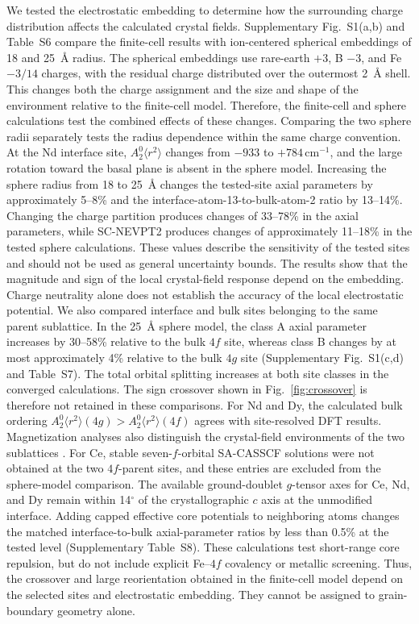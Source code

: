 \documentclass[final,1p,times]{elsarticle}
\newcommand{\Atwo}{\ensuremath{A_2^0\langle r^2\rangle}}
\DeclareRobustCommand{\rev}[1]{{\color{revcolor}#1}}
\newcommand{\invcm}{\ensuremath{\,\mathrm{cm}^{-1}}}
\begin{document}
\rev{We tested the electrostatic embedding to determine how the surrounding charge distribution affects the calculated crystal fields. Supplementary Fig.~S1(a,b) and Table~S6 compare the finite-cell results with ion-centered spherical embeddings of 18 and 25~\AA{} radius. The spherical embeddings use rare-earth $+3$, B $-3$, and Fe $-3/14$ charges, with the residual charge distributed over the outermost 2~\AA{} shell. This changes both the charge assignment and the size and shape of the environment relative to the finite-cell model. Therefore, the finite-cell and sphere calculations test the combined effects of these changes. Comparing the two sphere radii separately tests the radius dependence within the same charge convention. At the Nd interface site, $\Atwo$ changes from $-933$ to $+784$\invcm{}, and the large rotation toward the basal plane is absent in the sphere model. Increasing the sphere radius from 18 to 25~\AA{} changes the tested-site axial parameters by approximately 5--8\% and the interface-atom-13-to-bulk-atom-2 ratio by 13--14\%. Changing the charge partition produces changes of 33--78\% in the axial parameters, while SC-NEVPT2 produces changes of approximately 11--18\% in the tested sphere calculations. These values describe the sensitivity of the tested sites and should not be used as general uncertainty bounds. The results show that the magnitude and sign of the local crystal-field response depend on the embedding. Charge neutrality alone does not establish the accuracy of the local electrostatic potential.} \rev{We also compared interface and bulk sites belonging to the same parent sublattice. In the 25~\AA{} sphere model, the class A axial parameter increases by 30--58\% relative to the bulk $4f$ site, whereas class B changes by at most approximately 4\% relative to the bulk $4g$ site (Supplementary Fig.~S1(c,d) and Table~S7). The total orbital splitting increases at both site classes in the converged calculations. The sign crossover shown in Fig.~\ref{fig:crossover} is therefore not retained in these comparisons. For Nd and Dy, the calculated bulk ordering $\Atwo(4g)>\Atwo(4f)$ agrees with site-resolved DFT results. Magnetization analyses also distinguish the crystal-field environments of the two sublattices \cite{tatetsu2018,boust2022,cadogan1988}. For Ce, stable seven-$f$-orbital SA-CASSCF solutions were not obtained at the two $4f$-parent sites, and these entries are excluded from the sphere-model comparison. The available ground-doublet $g$-tensor axes for Ce, Nd, and Dy remain within 14$^\circ$ of the crystallographic $c$ axis at the unmodified interface. Adding capped effective core potentials to neighboring atoms changes the matched interface-to-bulk axial-parameter ratios by less than 0.5\% at the tested level (Supplementary Table~S8). These calculations test short-range core repulsion, but do not include explicit Fe--$4f$ covalency or metallic screening. Thus, the crossover and large reorientation obtained in the finite-cell model depend on the selected sites and electrostatic embedding. They cannot be assigned to grain-boundary geometry alone.}
\end{document}
